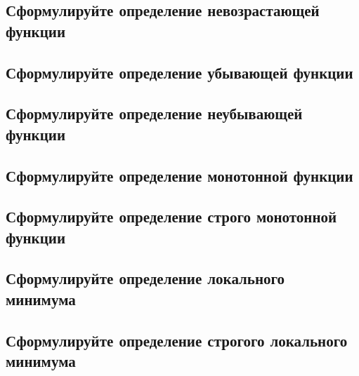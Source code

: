 \subsection{Сформулируйте определение невозрастающей функции}
\begin{definition}

\end{definition}

\subsection{ Сформулируйте определение убывающей функции}
\begin{definition}

\end{definition}

\subsection{ Сформулируйте определение неубывающей функции}
\begin{definition}

\end{definition}

\subsection{ Сформулируйте определение монотонной функции}
\begin{definition}

\end{definition}

\subsection{ Сформулируйте определение строго монотонной функции}
\begin{definition}

\end{definition}

\subsection{ Сформулируйте определение локального минимума}
\begin{definition}

\end{definition}

\subsection{ Сформулируйте определение строгого локального минимума}
\begin{definition}

\end{definition}

